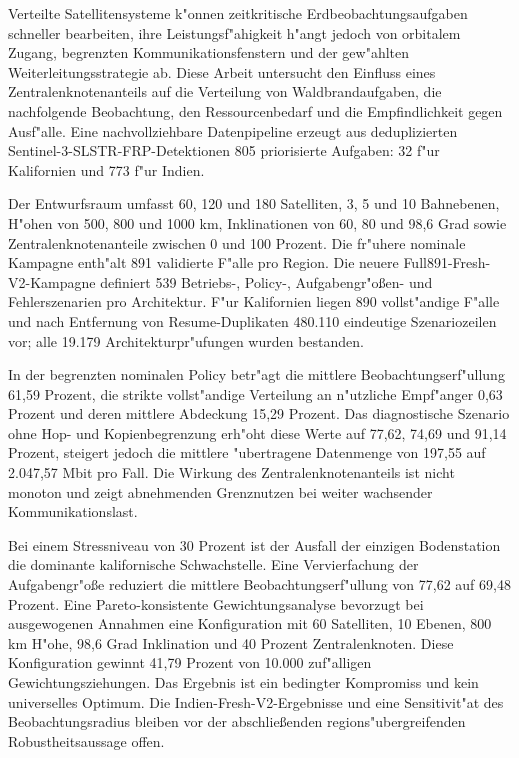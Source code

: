 Verteilte Satellitensysteme k"onnen zeitkritische Erdbeobachtungsaufgaben schneller bearbeiten, ihre Leistungsf"ahigkeit h"angt jedoch von orbitalem Zugang, begrenzten Kommunikationsfenstern und der gew"ahlten Weiterleitungsstrategie ab. Diese Arbeit untersucht den Einfluss eines Zentralenknotenanteils auf die Verteilung von Waldbrandaufgaben, die nachfolgende Beobachtung, den Ressourcenbedarf und die Empfindlichkeit gegen Ausf"alle. Eine nachvollziehbare Datenpipeline erzeugt aus deduplizierten Sentinel-3-SLSTR-FRP-Detektionen 805 priorisierte Aufgaben: 32 f"ur Kalifornien und 773 f"ur Indien.

Der Entwurfsraum umfasst 60, 120 und 180 Satelliten, 3, 5 und 10 Bahnebenen, H"ohen von 500, 800 und 1000 km, Inklinationen von 60, 80 und 98,6 Grad sowie Zentralenknotenanteile zwischen 0 und 100 Prozent. Die fr"uhere nominale Kampagne enth"alt 891 validierte F"alle pro Region. Die neuere Full891-Fresh-V2-Kampagne definiert 539 Betriebs-, Policy-, Aufgabengr"o\ss en- und Fehlerszenarien pro Architektur. F"ur Kalifornien liegen 890 vollst"andige F"alle und nach Entfernung von Resume-Duplikaten 480.110 eindeutige Szenariozeilen vor; alle 19.179 Architekturpr"ufungen wurden bestanden.

In der begrenzten nominalen Policy betr"agt die mittlere Beobachtungserf"ullung 61,59 Prozent, die strikte vollst"andige Verteilung an n"utzliche Empf"anger 0,63 Prozent und deren mittlere Abdeckung 15,29 Prozent. Das diagnostische Szenario ohne Hop- und Kopienbegrenzung erh"oht diese Werte auf 77,62, 74,69 und 91,14 Prozent, steigert jedoch die mittlere "ubertragene Datenmenge von 197,55 auf 2.047,57 Mbit pro Fall. Die Wirkung des Zentralenknotenanteils ist nicht monoton und zeigt abnehmenden Grenznutzen bei weiter wachsender Kommunikationslast.

Bei einem Stressniveau von 30 Prozent ist der Ausfall der einzigen Bodenstation die dominante kalifornische Schwachstelle. Eine Vervierfachung der Aufgabengr"o\ss e reduziert die mittlere Beobachtungserf"ullung von 77,62 auf 69,48 Prozent. Eine Pareto-konsistente Gewichtungsanalyse bevorzugt bei ausgewogenen Annahmen eine Konfiguration mit 60 Satelliten, 10 Ebenen, 800 km H"ohe, 98,6 Grad Inklination und 40 Prozent Zentralenknoten. Diese Konfiguration gewinnt 41,79 Prozent von 10.000 zuf"alligen Gewichtungsziehungen. Das Ergebnis ist ein bedingter Kompromiss und kein universelles Optimum. Die Indien-Fresh-V2-Ergebnisse und eine Sensitivit"at des Beobachtungsradius bleiben vor der abschlie\ss enden regions"ubergreifenden Robustheitsaussage offen.
